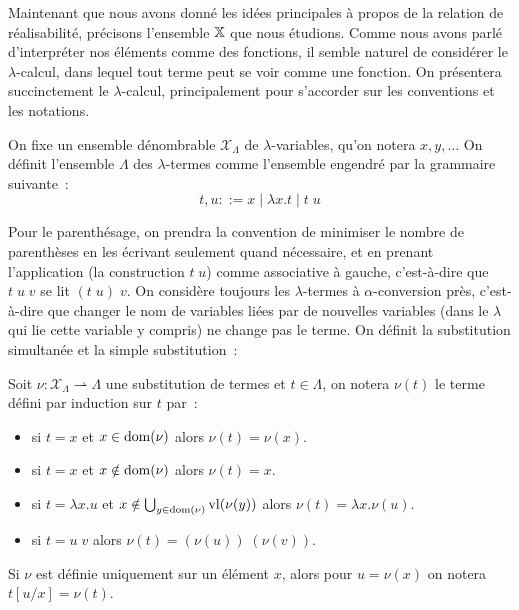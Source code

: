 \documentclass{article}
\begin{document}
Maintenant que nous avons donné les idées principales à propos de la relation de réalisabilité, précisons l'ensemble $\mathbb X$ que nous étudions. Comme nous avons parlé d'interpréter nos éléments comme des fonctions, il semble naturel de considérer le $\lambda$-calcul, dans lequel tout terme peut se voir comme une fonction. On présentera succinctement le $\lambda$-calcul, principalement pour s'accorder sur les conventions et les notations.

\begin{defi}\label{def.lam}
    On fixe un ensemble dénombrable $\mathcal X_\Lambda$ de $\lambda$-variables, qu'on notera $x,y,\ldots$ On définit l'ensemble $\Lambda$ des $\lambda$-termes comme l'ensemble engendré par la grammaire suivante~:
    \[t,u ::= x \mid \lambda x. t\mid t\;u\]
\end{defi}

Pour le parenthésage, on prendra la convention de minimiser le nombre de parenthèses en les écrivant seulement quand nécessaire, et en prenant l'application (la construction $t\;u$) comme associative à gauche, c'est-à-dire que $t\;u\;v$ se lit $(t\;u)\;v$. On considère toujours les $\lambda$-termes à $\alpha$-conversion près, c'est-à-dire que changer le nom de variables liées par de nouvelles variables (dans le $\lambda$ qui lie cette variable y compris) ne change pas le terme. On définit la substitution simultanée et la simple substitution~:

\begin{defi}
    Soit $\nu : \mathcal X_\Lambda \rightharpoonup \Lambda$ une substitution de termes et $t\in \Lambda$, on notera $\nu(t)$ le terme défini par induction sur $t$ par~:
    \begin{itemize}
        \item si $t = x$ et $x \in \mathrm{dom}(\nu)$ alors $\nu(t) = \nu(x)$.
        \item si $t = x$ et $x\notin\mathrm{dom}(\nu)$ alors $\nu(t) = x$.
        \item si $t = \lambda x.u$ et $x\notin\bigcup_{y\in\mathrm{dom}(\nu)}\mathrm{vl}(\nu(y))$ alors $\nu(t) = \lambda x.\nu(u)$.
        \item si $t = u\;v$ alors $\nu(t) = (\nu(u))\;(\nu(v))$.
    \end{itemize}

    Si $\nu$ est définie uniquement sur un élément $x$, alors pour $u = \nu(x)$ on notera $t[u/x] = \nu(t)$.
\end{defi}
\end{document}
